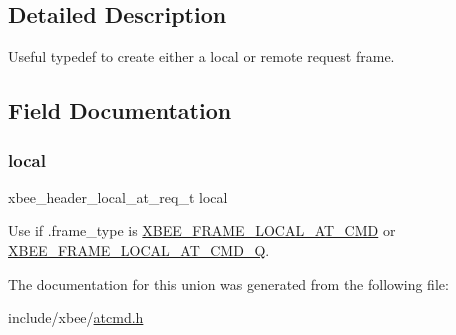 \subsection{Detailed Description}
Useful typedef to create either a local or remote request frame. 

\subsection{Field Documentation}
\mbox{\label{unionxbee__header__at__request__t_aae9b1a9bf279fa1932c6222e3d4b5da2}} 
\subsubsection{\texorpdfstring{local}{local}}
{\footnotesize\ttfamily xbee\+\_\+header\+\_\+local\+\_\+at\+\_\+req\+\_\+t local}



Use if .frame\+\_\+type is \hyperlink{group__xbee__device_gga7753bbebaf00d6d64942f64b6ae9b7b9a540fdafbf3dbb8b5d07be5888e3573ee}{X\+B\+E\+E\+\_\+\+F\+R\+A\+M\+E\+\_\+\+L\+O\+C\+A\+L\+\_\+\+A\+T\+\_\+\+C\+MD} or \hyperlink{group__xbee__device_gga7753bbebaf00d6d64942f64b6ae9b7b9a4dccc9c3f9859247218c0d0a93e2582a}{X\+B\+E\+E\+\_\+\+F\+R\+A\+M\+E\+\_\+\+L\+O\+C\+A\+L\+\_\+\+A\+T\+\_\+\+C\+M\+D\+\_\+Q}. 



The documentation for this union was generated from the following file\+:\begin{DoxyCompactItemize}
\item 
include/xbee/\hyperlink{atcmd_8h}{atcmd.\+h}\end{DoxyCompactItemize}
